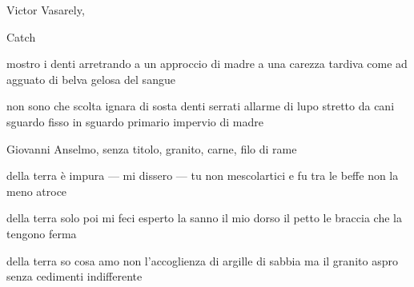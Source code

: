\clearpage


\begin{artItem}
	Victor Vasarely, \begin{otherlanguage}{english}%
		Catch%
	\end{otherlanguage}
\end{artItem}

\begin{poem}
	\begin{stanza}
		mostro i denti arretrando\verseline
		a un approccio di madre\verseline
		a una carezza tardiva\verseline
		come ad agguato di belva\verseline
		gelosa del sangue
	\end{stanza}

	\begin{stanza}
		non sono che scolta ignara\verseline
		di sosta denti serrati\verseline
		allarme di lupo stretto da cani\verseline
		sguardo fisso in sguardo\verseline
		primario impervio di madre
	\end{stanza}
\end{poem}

\clearpage


\begin{artItem}
	Giovanni Anselmo, senza titolo, granito, carne, filo di rame
\end{artItem}

\begin{poem}
	\begin{stanza}
		della terra\verseline
		è impura — mi dissero —\verseline
		tu non mescolartici\verseline
		e fu tra le beffe\verseline
		non la meno atroce
	\end{stanza}

	\begin{stanza}
		della terra\verseline
		solo poi mi feci esperto\verseline
		la sanno il mio dorso il petto\verseline
		le braccia che la tengono ferma
	\end{stanza}

	\begin{stanza}
		della terra\verseline
		so cosa amo\verseline
		non l'accoglienza di argille di sabbia\verseline
		ma il granito aspro\verseline
		senza cedimenti\verseline
		indifferente
	\end{stanza}
\end{poem}

\clearpage


